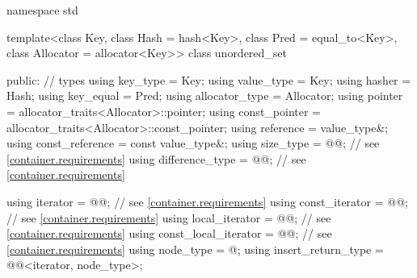 %
\begin{codeblock}
namespace std {
  template<class Key,
           class Hash = hash<Key>,
           class Pred = equal_to<Key>,
           class Allocator = allocator<Key>>
  class unordered_set {
  public:
    // types
    using key_type             = Key;
    using value_type           = Key;
    using hasher               = Hash;
    using key_equal            = Pred;
    using allocator_type       = Allocator;
    using pointer              = allocator_traits<Allocator>::pointer;
    using const_pointer        = allocator_traits<Allocator>::const_pointer;
    using reference            = value_type&;
    using const_reference      = const value_type&;
    using size_type            = @@; // see \ref{container.requirements}
    using difference_type      = @@; // see \ref{container.requirements}

    using iterator             = @@; // see \ref{container.requirements}
    using const_iterator       = @@; // see \ref{container.requirements}
    using local_iterator       = @@; // see \ref{container.requirements}
    using const_local_iterator = @@; // see \ref{container.requirements}
    using node_type            = @\unspec@;
    using insert_return_type   = @@<iterator, node_type>;

}}
\end{codeblock}
